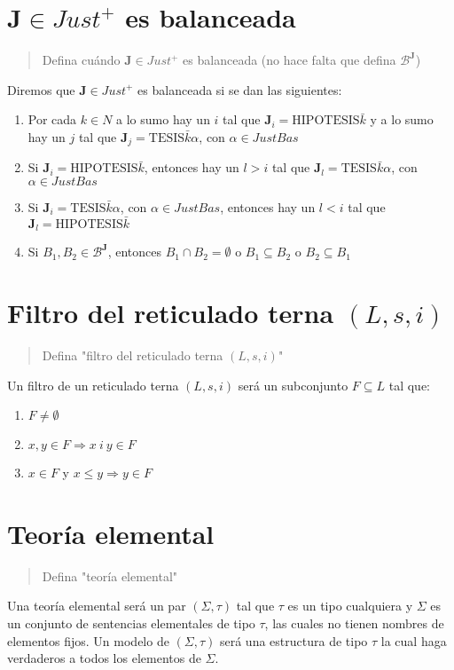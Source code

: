 \documentclass{article}
\begin{document}
\section{$\mathbf{J}\in Just^+$ es balanceada}
\begin{quote}
  Defina cuándo $\mathbf{J}\in Just^+$ es balanceada (no hace falta que defina $\mathcal{B}^\mathbf{J}$)
\end{quote}
Diremos que $\mathbf{J}\in Just^+$ es balanceada si se dan las siguientes:
\begin{enumerate}
  \item Por cada $k\in N$ a lo sumo hay un $i$ tal que $\mathbf{J}_i=\text{HIPOTESIS}\bar{k}$ y a lo sumo hay un $j$ tal que $\mathbf{J}_j=\text{TESIS}\bar{k}\alpha$, con $\alpha\in JustBas$
  \item Si $\mathbf{J}_i=\text{HIPOTESIS}\bar{k}$, entonces hay un $l>i$ tal que $\mathbf{J}_l=\text{TESIS}\bar{k}\alpha$, con $\alpha\in JustBas$
  \item Si $\mathbf{J}_i=\text{TESIS}\bar{k}\alpha$, con $\alpha\in JustBas$, entonces hay un $l<i$ tal que $\mathbf{J}_l=\text{HIPOTESIS}\bar{k}$
  \item Si $B_1,B_2\in\mathcal{B}^\mathbf{J}$, entonces $B_1\cap B_2=\emptyset$ o $B_1\subseteq B_2$ o $B_2\subseteq B_1$
\end{enumerate}

\section{Filtro del reticulado terna $(L,s,i)$}
\begin{quote}
  Defina "filtro del reticulado terna $(L,s,i)$"
\end{quote}
Un filtro de un reticulado terna $(L,s,i)$ será un subconjunto $F\subseteq L$ tal que:
\begin{enumerate}
  \item $F\neq\emptyset$
  \item $x,y\in F\Rightarrow x\ i\ y\in F$
  \item $x\in F$ y $x\leq y\Rightarrow y\in F$
\end{enumerate}

\section{Teoría elemental}
\begin{quote}
  Defina "teoría elemental"
\end{quote}
Una teoría elemental será un par $(\Sigma,\tau)$ tal que $\tau$ es un tipo cualquiera y $\Sigma$ es un conjunto de sentencias elementales de tipo $\tau$, las cuales no tienen nombres de elementos fijos.
\newline
Un modelo de $(\Sigma,\tau)$ será una estructura de tipo $\tau$ la cual haga verdaderos a todos los elementos de $\Sigma$.
\end{document}

